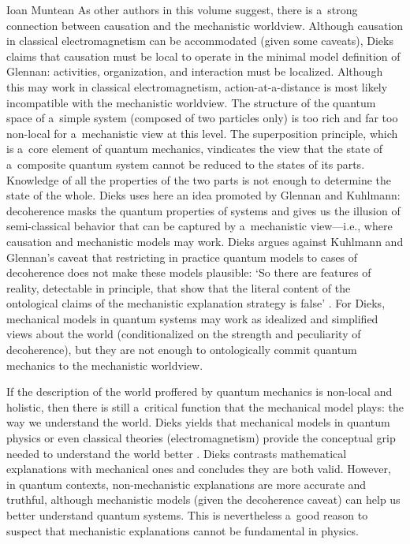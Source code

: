 \begin{recengenv}{Ioan Muntean}
As other authors in this volume suggest, there is a~strong connection between causation and the mechanistic worldview. Although causation in classical electromagnetism can be accommodated (given some caveats), Dieks claims that causation must be local to operate in the minimal model definition of Glennan: activities, organization, and interaction must be localized. Although this may work in classical electromagnetism, action-at-a-distance is most likely incompatible with the mechanistic worldview. The structure of the quantum space of a~simple system (composed of two particles only) is too rich and far too non-local for a~mechanistic view at this level. The superposition principle, which is a~core element of quantum mechanics, vindicates the view that the state of a~composite quantum system cannot be reduced to the states of its parts. Knowledge of all the properties of the two parts is not enough to determine the state of the whole. Dieks uses here an idea promoted by Glennan and Kuhlmann: decoherence masks the quantum properties of systems and gives us the illusion of semi-classical behavior that can be captured by a~mechanistic view---i.e., where causation and mechanistic models may work. Dieks argues against Kuhlmann and Glennan's caveat that restricting in practice quantum models to cases of decoherence does not make these models plausible: ‘So there are features of reality, detectable in principle, that show that the literal content of the ontological claims of the mechanistic explanation strategy is false'
\parencite*[][p.60]{falkenburg_mechanistic_2019}. %
 For Dieks, mechanical models in quantum systems may work as idealized and simplified views about the world (conditionalized on the strength and peculiarity of decoherence), but they are not enough to ontologically commit quantum mechanics to the mechanistic worldview.

If the description of the world proffered by quantum mechanics is non-local and holistic, then there is still a~critical function that the mechanical model plays: the way we understand the world. Dieks yields that mechanical models in quantum physics or even classical theories (electromagnetism) provide the conceptual grip needed to understand the world better
\parencite*[][p.63]{falkenburg_mechanistic_2019}. %
 Dieks contrasts mathematical explanations with mechanical ones and concludes they are both valid. However, in quantum contexts, non-mechanistic explanations are more accurate and truthful, although mechanistic models (given the decoherence caveat) can help us better understand quantum systems. This is nevertheless a~good reason to suspect that mechanistic explanations cannot be fundamental in physics.


\end{recengenv}
